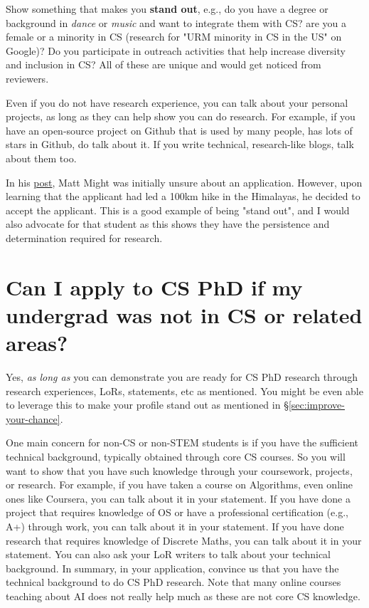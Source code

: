 \documentclass[oneside,11pt]{memoir}
\begin{document}
 Show something that makes you \textbf{stand out}, e.g., do you have a degree or background in \emph{dance} or \emph{music} and want to integrate them with CS? are you a female or a minority in CS (research for "URM minority in CS in the US" on Google)? Do you participate in outreach activities that help increase diversity and inclusion in CS? All of these are unique and would get noticed from reviewers. 
    
Even if you do not have research experience, you can talk about your personal projects, as long as they can help show you can do research. For example, if you have an open-source project on Github that is used by many people, has lots of stars in Github, do talk about it. If you write technical, research-like blogs, talk about them too.


In his \href{https://matt.might.net/articles/how-to-apply-and-get-in-to-graduate-school-in-science-mathematics-engineering-or-computer-science/}{post}, Matt Might was initially unsure about an application. However, upon learning that the applicant had led a 100km hike in the Himalayas, he decided to accept the applicant.  This is a good example of being "stand out", and I would also advocate for that student as this shows they have the persistence and determination required for research.




\section{Can I apply to CS PhD if my undergrad was not in CS or related areas?}\label{sec:non-stem}

Yes, \emph{as long as} you can demonstrate you are ready for CS PhD research through research experiences, LoRs, statements, etc as mentioned. You might be even able to leverage this to make your profile stand out as mentioned in \S\ref{sec:improve-your-chance}. 

One main concern for non-CS or non-STEM students is if you have the sufficient technical background, typically obtained through core CS courses.  So you will want to show that you have such knowledge through your coursework, projects, or research. 
For example, if you have taken a course on Algorithms, even online ones like Coursera, you can talk about it in your statement.  If you have done a project that requires knowledge of OS or have a professional certification (e.g., A+) through work, you can talk about it in your statement.  If you have done research that requires knowledge of Discrete Maths, you can talk about it in your statement.  You can also ask your LoR writers to talk about your technical background.  
In summary, in your application, convince us that you have the technical background to do CS PhD research. 
Note that many online courses teaching about AI does not really help much as these are not core CS knowledge.
\end{document}
